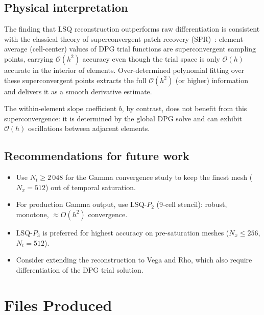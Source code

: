 \documentclass[11pt,a4paper]{article}
\newcommand{\Nx}{N_x}
\newcommand{\bigo}[1]{\mathcal{O}(#1)}
\begin{document}
\subsection{Physical interpretation}

The finding that LSQ reconstruction outperforms raw differentiation is
consistent with the classical theory of superconvergent patch recovery
(SPR)~\cite{zienkiewicz1992}: element-average (cell-center) values of
DPG trial functions are superconvergent sampling points, carrying
$\bigo{h^2}$ accuracy even though the trial space is only $\bigo{h}$
accurate in the interior of elements.  Over-determined polynomial fitting
over these superconvergent points extracts the full $\bigo{h^2}$ (or
higher) information and delivers it as a smooth derivative estimate.

The within-element slope coefficient $b$, by contrast, does not benefit
from this superconvergence: it is determined by the global DPG solve
and can exhibit $\bigo{h}$ oscillations between adjacent elements.

\subsection{Recommendations for future work}

\begin{itemize}[noitemsep]
  \item Use $N_t \ge 2\,048$ for the Gamma convergence study to keep
        the finest mesh ($\Nx = 512$) out of temporal saturation.
  \item For production Gamma output, use LSQ-$P_2$ (9-cell stencil):
        robust, monotone, $\approx O(h^2)$ convergence.
  \item LSQ-$P_3$ is preferred for highest accuracy on pre-saturation
        meshes ($\Nx \le 256$, $N_t = 512$).
  \item Consider extending the reconstruction to Vega and Rho,
        which also require differentiation of the DPG trial solution.
\end{itemize}

\section{Files Produced}
\end{document}

